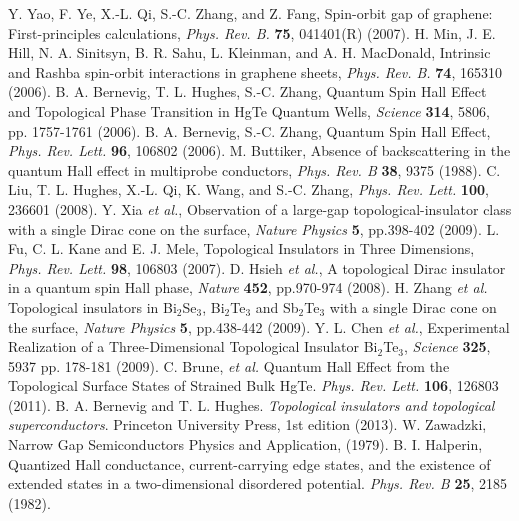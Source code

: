 \documentclass[titlepage,a4paper]{book}
\begin{document}
\begin{thebibliography}{199}
Y. Yao, F. Ye, X.-L. Qi, S.-C. Zhang, and Z. Fang, Spin-orbit gap of graphene: First-principles calculations, \textit{Phys. Rev. B.} \textbf{75}, 041401(R) (2007).
H. Min, J. E. Hill, N. A. Sinitsyn, B. R. Sahu, L. Kleinman, and A. H. MacDonald, Intrinsic and Rashba spin-orbit interactions in graphene sheets, \textit{Phys. Rev. B.} \textbf{74}, 165310 (2006).
B. A. Bernevig, T. L. Hughes, S.-C. Zhang, Quantum Spin Hall Effect and Topological Phase Transition in HgTe Quantum Wells, \textit{Science} \textbf{314}, 5806, pp. 1757-1761 (2006).
B. A. Bernevig, S.-C. Zhang, Quantum Spin Hall Effect, \textit{Phys. Rev. Lett.} \textbf{96}, 106802 (2006).
M. Buttiker, Absence of backscattering in the quantum Hall effect in multiprobe conductors, \textit{Phys. Rev. B} \textbf{38}, 9375 (1988).
C. Liu, T. L. Hughes, X.-L. Qi, K. Wang, and S.-C. Zhang, \textit{Phys. Rev. Lett.} \textbf{100}, 236601 (2008).
Y. Xia \textit{et al.}, Observation of a large-gap topological-insulator class with a single Dirac cone on the surface, \textit{Nature Physics} \textbf{5}, pp.398-402 (2009).
L. Fu, C. L. Kane and E. J. Mele, Topological Insulators in Three Dimensions, \textit{Phys. Rev. Lett.} \textbf{98}, 106803 (2007).
D. Hsieh \textit{et al.}, A topological Dirac insulator in a quantum spin Hall phase, \textit{Nature} \textbf{452}, pp.970-974 (2008).
H. Zhang \textit{et al.} Topological insulators in Bi$_2$Se$_3$, Bi$_2$Te$_3$ and Sb$_2$Te$_3$ with a single Dirac cone on the surface, \textit{Nature Physics} \textbf{5}, pp.438-442 (2009).
Y. L. Chen \textit{et al.}, Experimental Realization of a Three-Dimensional Topological Insulator Bi$_2$Te$_3$, \textit{Science} \textbf{325}, 5937 pp. 178-181 (2009).
C. Brune, \textit{et al.} Quantum Hall Effect from the Topological Surface States of Strained Bulk HgTe. \textit{Phys. Rev. Lett.} \textbf{106}, 126803 (2011).
B. A. Bernevig and T. L. Hughes. \textit{Topological insulators and topological superconductors}. Princeton University Press, 1st edition (2013).
W. Zawadzki, Narrow Gap Semiconductors Physics and Application, (1979).
B. I. Halperin, Quantized Hall conductance, current-carrying edge states, and the existence of extended states in a two-dimensional disordered potential. \textit{Phys. Rev. B} \textbf{25}, 2185 (1982).

\end{thebibliography}
\end{document}
